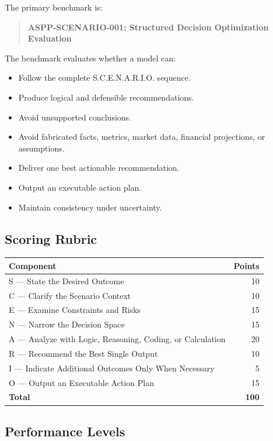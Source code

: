 \documentclass[11pt]{article}
\begin{document}
The primary benchmark is:

\begin{quote}
\textbf{ASPP-SCENARIO-001: Structured Decision Optimization Evaluation}
\end{quote}

The benchmark evaluates whether a model can:

\begin{itemize}[leftmargin=*]
    \item Follow the complete S.C.E.N.A.R.I.O. sequence.
    \item Produce logical and defensible recommendations.
    \item Avoid unsupported conclusions.
    \item Avoid fabricated facts, metrics, market data, financial projections, or assumptions.
    \item Deliver one best actionable recommendation.
    \item Output an executable action plan.
    \item Maintain consistency under uncertainty.
\end{itemize}

\subsection{Scoring Rubric}

\begin{longtable}{p{} r}
\toprule
\textbf{Component} & \textbf{Points} \\
\midrule
S --- State the Desired Outcome & 10 \\
C --- Clarify the Scenario Context & 10 \\
E --- Examine Constraints and Risks & 15 \\
N --- Narrow the Decision Space & 15 \\
A --- Analyze with Logic, Reasoning, Coding, or Calculation & 20 \\
R --- Recommend the Best Single Output & 10 \\
I --- Indicate Additional Outcomes Only When Necessary & 5 \\
O --- Output an Executable Action Plan & 15 \\
\midrule
\textbf{Total} & \textbf{100} \\
\bottomrule
\end{longtable}

\subsection{Performance Levels}
\end{document}
